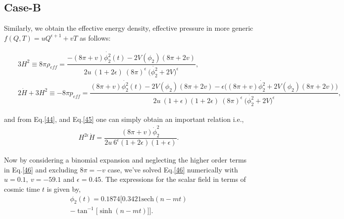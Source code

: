 \documentclass[aps,prd,showpacs,nofootinbib,floats,floatfix,preprintnumbers,groupedaddress,twocolumn]{revtex4-1}
\def \e{\epsilon}
\def \ben{\begin{eqnarray}}
\def \een{\end{eqnarray}}
\def \r{\rho}
\def \non{\nonumber}
\begin{document}
\subsection{Case-B}
\noindent
    Similarly, we obtain the effective energy density, effective pressure in more generic $f(Q,T)=u Q^{\e+1}+v T$ as follows:

\begin{widetext}
\ben
    &&3H^2\equiv 8\pi\r_{eff}=\dfrac{-(8\pi+v){\dot{\phi_{2}^2}}(t)-2V(\phi_2)(8\pi+2v)}{2u~(1+2\e)~(8\pi)^{\e}~\big({\dot{\phi_{2}^2}}+2V\big)^{\e}},\label{44}
\\
    &&2\dot{H}+3H^2\equiv -8\pi p_{eff}=\dfrac{(8\pi+v){\dot{\phi_{2}^2}}(t)-2V(\phi_2)(8\pi+2v)-\e\big((8\pi+v){\dot{\phi_{2}^2}}+2V(\phi_2)(8\pi+2v)\big)}{2u~(1+\e)(1+2\e)~(8\pi)^{\e}~\big({\dot{\phi_{2}^2}}+2V\big)^{\e}},\label{45}
\een    
\end{widetext}
\noindent
    and from Eq.\eqref{44}, and Eq.\eqref{45} one can simply obtain an important relation i.e.,
\ben
    H^{2\e}\dot{H}=\dfrac{(8\pi+v){\dot{\phi}}^2_{2}}{2u~6^{\e}(1+2\e)(1+\e)}.\label{46}
\een

    Now by considering a binomial expansion and neglecting the higher order terms in Eq.\eqref{46} and excluding $8\pi=-v$ case, we've solved Eq.\eqref{46} numerically with $u=0.1,~v=-59.1$ and $\e=0.45$. The expressions for the scalar field in terms of cosmic time $t$ is given by,
\ben
    \phi_{2}(t)=0.1874\Big[0.3421\text{sech}(n-mt)\non\\
    -\tan^{-1}\big[\sinh(n-mt)\big]\Big].\label{47}
\een
    
\end{document}
